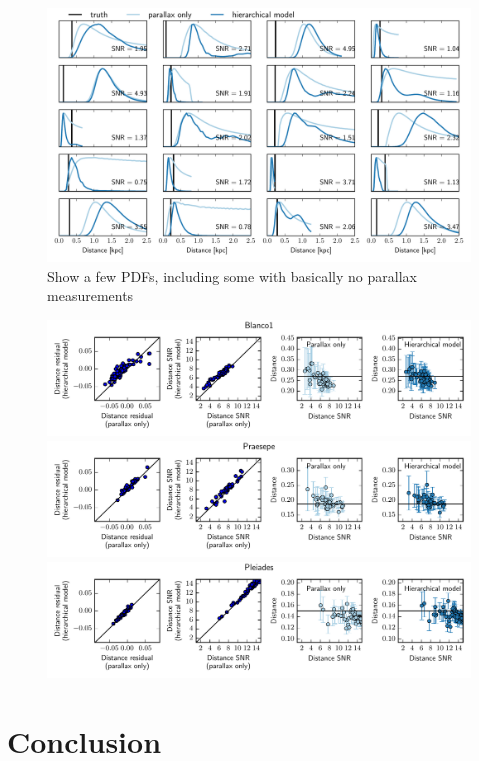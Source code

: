 \documentclass[aps,prd,showpacs,superscriptaddress,groupedaddress]{revtex4}  %
\begin{document}
\begin{figure}
\includegraphics[width=17cm]{cv_noisified_pdfs.pdf}
\caption{Show a few PDFs, including some with basically no parallax measurements}
\end{figure}


\begin{figure}
\includegraphics[width=17cm]{Blanco1_metrics.pdf}
\includegraphics[width=17cm]{Praesepe_metrics.pdf}
\includegraphics[width=17cm]{Pleiades_metrics.pdf}
\end{figure}


\section{Conclusion}
\end{document}

